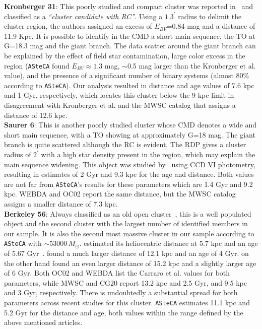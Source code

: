 \documentclass[draft]{aa}
\begin{document}
\begin{appendix}
  \noindent \textbf{Kronberger 31}: This poorly studied and compact cluster was reported
  in~\cite{Kronberger_2006} and classified as a \emph{``cluster candidate with
  RC''}. Using a $1.3^{\prime}$ radius to delimit the cluster region, the authors
  assigned an excess of $E_{BV}$=0.84 mag and a distance of 11.9 Kpc.
  It is possible to identify in the CMD a short main sequence, the TO at G=18.3
  mag and the giant branch. The data scatter around the giant branch can be
  explained by the effect of field star contamination, large color excess in the
  region (\texttt{ASteCA} found $E_{BV}\approx1.3$ mag, $\sim$0.5 mag larger
  than the Kronberger et al. value), and the presence of a significant number of binary
  systems (almost 80\% according to \texttt{ASteCA}). Our analysis resulted in
  distance and age values of 7.6 kpc and 1 Gyr, respectively, which
  locates this cluster below the 9 kpc limit in disagreement with Kronberger et
  al. and the MWSC catalog that assigns a distance of 12.6 kpc.\\

  \noindent \textbf{Saurer 6}: This is another poorly studied cluster whose CMD denotes a
  wide and short main sequence, with a TO showing at approximately G=18 mag. The
  giant branch is quite scattered although the RC is evident.
  The RDP gives a cluster radius of $2^{\prime}$ with a high star density
  present in the region, which may explain the main sequence widening.
  This object was studied by~\cite{Frinchaboy_2002} using CCD VI photometry,
  resulting in estimates of 2 Gyr and 9.3 kpc for the age and distance.
  Both values are not far from \texttt{ASteCA}'s results for these parameters
  which are 1.4 Gyr and 9.2 kpc. WEBDA and OC02 report the same distance, but
  the MWSC catalog assigns a smaller distance of 7.3 kpc.\\

  \noindent \textbf{Berkeley 56}: Always classified as an old open
  cluster~\citep[see for example][]{King_1964}, this is a well populated object
  and the second cluster with the largest number of identified members in our
  sample. It is also the second most massive cluster in our sample according
  to \texttt{ASteCA} with $\sim53000\,M_{\odot}$.
  \cite{Janes_1994} estimated its heliocentric distance at 5.7 kpc and an age of
  5.67 Gyr~\citep[according to][]{Salaris_2004}. \cite{Carraro_2006} found a
  much larger distance of 12.1 kpc and an age of 4 Gyr. \cite{Janes_2011} on the
  other hand found an even larger distance of 15.2 kpc and a slightly larger age
  of 6 Gyr.
  Both OC02 and WEBDA list the Carraro et al. values for both parameters, while
  MWSC and CG20 report 13.2 kpc and 2.5 Gyr, and 9.5 kpc and 3
  Gyr, respectively. There is undoubtedly a substantial spread for both
  parameters across recent studies for this cluster.
  \texttt{ASteCA} estimates 11.1 kpc and 5.2 Gyr for the distance and age,
  both values within the range defined by the above mentioned articles.\\


\end{appendix}
\end{document}
